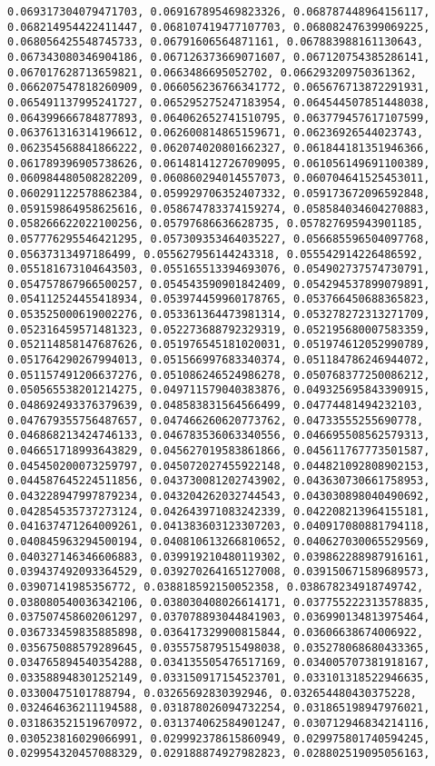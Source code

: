 \documentclass[11pt]{article}
\begin{document}
\begin{Verbatim}[commandchars=\\\{\}]
0.069317304079471703, 0.069167895469823326, 0.068787448964156117, 0.068214954422411447, 0.068107419477107703, 0.068082476399069225, 0.068056425548745733, 0.06791606564871161, 0.067883988161130643, 0.067343080346904186, 0.067126373669071607, 0.067120754385286141, 0.067017628713659821, 0.0663486695052702, 0.066293209750361362, 0.066207547818260909, 0.066056236766341772, 0.065676713872291931, 0.065491137995241727, 0.065295275247183954, 0.064544507851448038, 0.064399666784877893, 0.064062652741510795, 0.063779457617107599, 0.063761316314196612, 0.062600814865159671, 0.06236926544023743, 0.062354568841866222, 0.062074020801662327, 0.061844181351946366, 0.061789396905738626, 0.061481412726709095, 0.061056149691100389, 0.060984480508282209, 0.060860294014557073, 0.060704641525453011, 0.060291122578862384, 0.059929706352407332, 0.059173672096592848, 0.059159864958625616, 0.058674783374159274, 0.058584034604270883, 0.058266622022100256, 0.05797686636628735, 0.057827695943901185, 0.057776295546421295, 0.057309353464035227, 0.056685596504097768, 0.05637313497186499, 0.055627956144243318, 0.055542914226486592, 0.055181673104643503, 0.055165513394693076, 0.054902737574730791, 0.054757867966500257, 0.054543590901842409, 0.054294537899079891, 0.054112524455418934, 0.053974459960178765, 0.053766450688365823, 0.053525000619002276, 0.053361364473981314, 0.053278272313271709, 0.052316459571481323, 0.052273688792329319, 0.052195680007583359, 0.052114858147687626, 0.051976545181020031, 0.051974612052990789, 0.051764290267994013, 0.051566997683340374, 0.051184786246944072, 0.051157491206637276, 0.051086246524986278, 0.050768377250086212, 0.050565538201214275, 0.049711579040383876, 0.049325695843390915, 0.048692493376379639, 0.048583831564566499, 0.04774481494232103, 0.047679355756487657, 0.047466260620773762, 0.04733555255690778, 0.046868213424746133, 0.046783536063340556, 0.046695508562579313, 0.046651718993643829, 0.045627019583861866, 0.045611767773501587, 0.045450200073259797, 0.045072027455922148, 0.044821092808902153, 0.044587645224511856, 0.043730081202743902, 0.043630730661758953, 0.043228947997879234, 0.043204262032744543, 0.043030898040490692, 0.042854535737273124, 0.042643971083242339, 0.042208213964155181, 0.041637471264009261, 0.041383603123307203, 0.040917080881794118, 0.040845963294500194, 0.040810613266810652, 0.040627030065529569, 0.040327146346606883, 0.039919210480119302, 0.039862288987916161, 0.039437492093364529, 0.039270264165127008, 0.039150671589689573, 0.03907141985356772, 0.038818592150052358, 0.038678234918749742, 0.038080540036342106, 0.038030408026614171, 0.037755222313578835, 0.037507458602061297, 0.037078893044841903, 0.036990134813975464, 0.036733459835885898, 0.036417329900815844, 0.03606638674006922, 0.035675088579289645, 0.035575879515498038, 0.035278068680433365, 0.034765894540354288, 0.034135505476517169, 0.034005707381918167, 0.033588948301252149, 0.033150917154523701, 0.033101318522946635, 0.03300475101788794, 0.03265692830392946, 0.032654480430375228, 0.032464636211194588, 0.031878026094732254, 0.031865198947976021, 0.031863521519670972, 0.031374062584901247, 0.030712946834214116, 0.030523816029066991, 0.029992378615860949, 0.029975801740594245, 0.029954320457088329, 0.029188874927982823, 0.028802519095056163, 
\end{Verbatim}
\end{document}
